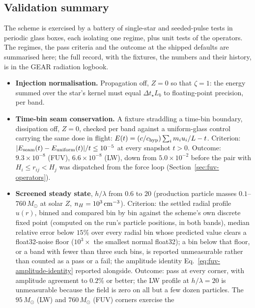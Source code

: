\subsection{Validation summary}
\label{sec:fuv-validation}

The scheme is exercised by a battery of single-star and seeded-pulse
tests in periodic glass boxes, each isolating one regime, plus unit
tests of the operators. The regimes, the pass criteria and the outcome
at the shipped defaults are summarised here; the full record, with the
fixtures, the numbers and their history, is in the GEAR radiation
logbook.

\begin{itemize}
  \item \textbf{Injection normalisation.} Propagation off, $Z=0$ so
    that $\zeta = 1$: the energy summed over the star's kernel must
    equal $\Delta t_\star L_b$ to floating-point precision, per band.
  \item \textbf{Time-bin seam conservation.} A fixture straddling a
    time-bin boundary, dissipation off, $Z=0$, checked per band against
    a uniform-glass control carrying the same dose in flight:
    $E(t) = (c/c_{\rm hyp})\sum_i m_i u_i/L - t$. Criterion:
    $|E_{\rm seam}(t) - E_{\rm uniform}(t)|/t \le 10^{-5}$ at every
    snapshot $t>0$. Outcome: $9.3\times10^{-8}$ (FUV), $6.6\times10^{-8}$
    (LW), down from $5.0\times10^{-2}$ before the pair with
    $H_i \le r_{ij} < H_j$ was dispatched from the force loop
    (Section~\ref{sec:fuv-operators}).
  \item \textbf{Screened steady state}, $h/\lambda$ from $0.6$ to $20$
    (production particle masses $0.1$--$760\,M_\odot$ at solar $Z$,
    $n_H = 10^3\,{\rm cm^{-3}}$). Criterion: the settled radial profile
    $u(r)$, binned and compared bin by bin against the scheme's own
    discrete fixed point (computed on the run's particle positions, in
    both bands), median relative error below $15\%$ over every radial
    bin whose predicted value clears a float32-noise floor
    ($10^3\times$ the smallest normal float32); a bin below that floor,
    or a band with fewer than three such bins, is reported unmeasurable
    rather than counted as a pass or a fail; the amplitude identity
    Eq.~\ref{eq:fuv-amplitude-identity} reported alongside. Outcome:
    pass at every corner, with amplitude agreement to $0.2\%$ or
    better; the LW profile at $h/\lambda = 20$ is unmeasurable because
    the field is zero on all but a few dozen particles. The
    $95\,M_\odot$ (LW) and $760\,M_\odot$ (FUV) corners exercise the

\end{itemize}
